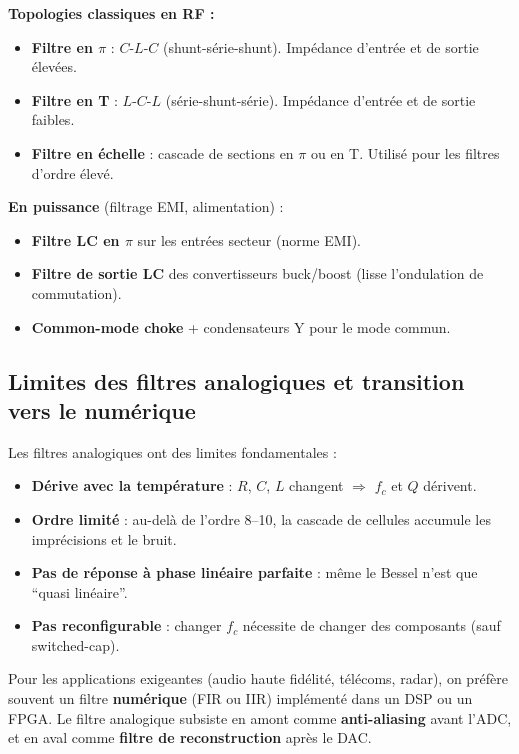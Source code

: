 \documentclass[12pt,a4paper,twoside]{book}
\begin{document}
\begin{pratique}
\textbf{Topologies classiques en RF :}
\begin{itemize}[nosep]
\item \textbf{Filtre en $\pi$} : $C$-$L$-$C$ (shunt-série-shunt). Impédance d'entrée et de sortie élevées.
\item \textbf{Filtre en T} : $L$-$C$-$L$ (série-shunt-série). Impédance d'entrée et de sortie faibles.
\item \textbf{Filtre en échelle} : cascade de sections en $\pi$ ou en T. Utilisé pour les filtres d'ordre élevé.
\end{itemize}

\textbf{En puissance} (filtrage EMI, alimentation) :
\begin{itemize}[nosep]
\item \textbf{Filtre LC en $\pi$} sur les entrées secteur (norme EMI).
\item \textbf{Filtre de sortie LC} des convertisseurs buck/boost (lisse l'ondulation de commutation).
\item \textbf{Common-mode choke} + condensateurs Y pour le mode commun.
\end{itemize}
\end{pratique}

\subsection{Limites des filtres analogiques et transition vers le numérique}

\begin{attention}
Les filtres analogiques ont des limites fondamentales :
\begin{itemize}[nosep]
\item \textbf{Dérive avec la température} : $R$, $C$, $L$ changent $\Rightarrow$ $f_c$ et $Q$ dérivent.
\item \textbf{Ordre limité} : au-delà de l'ordre 8--10, la cascade de cellules accumule les imprécisions et le bruit.
\item \textbf{Pas de réponse à phase linéaire parfaite} : même le Bessel n'est que ``quasi linéaire''.
\item \textbf{Pas reconfigurable} : changer $f_c$ nécessite de changer des composants (sauf switched-cap).
\end{itemize}

Pour les applications exigeantes (audio haute fidélité, télécoms, radar), on préfère souvent un filtre \textbf{numérique} (FIR ou IIR) implémenté dans un DSP ou un FPGA. Le filtre analogique subsiste en amont comme \textbf{anti-aliasing} avant l'ADC, et en aval comme \textbf{filtre de reconstruction} après le DAC.
\end{attention}
\end{document}
